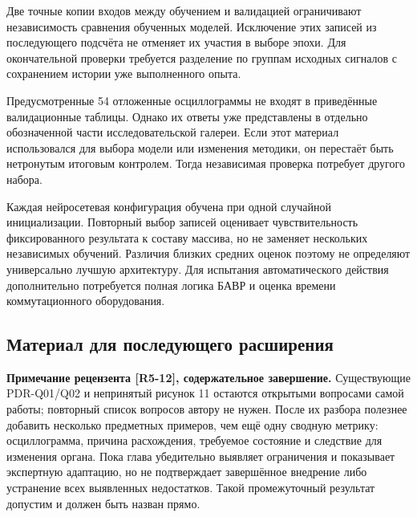 Две точные копии входов между обучением
и валидацией ограничивают независимость
сравнения обученных моделей.
Исключение этих записей из последующего подсчёта
не отменяет их участия в выборе эпохи.
Для окончательной проверки требуется разделение
по группам исходных сигналов
с сохранением истории уже выполненного опыта.

Предусмотренные 54 отложенные осциллограммы
не входят в приведённые валидационные таблицы.
Однако их ответы уже представлены
в отдельно обозначенной части исследовательской галереи.
Если этот материал использовался для выбора модели
или изменения методики, он перестаёт быть
нетронутым итоговым контролем.
Тогда независимая проверка потребует другого набора.

Каждая нейросетевая конфигурация обучена
при одной случайной инициализации.
Повторный выбор записей оценивает
чувствительность фиксированного результата к составу массива,
но не заменяет нескольких независимых обучений.
Различия близких средних оценок
поэтому не определяют универсально лучшую архитектуру.
Для испытания автоматического действия
дополнительно потребуется полная логика БАВР
и оценка времени коммутационного оборудования.

\subsection{Материал для последующего расширения}
\label{sec:ch5_results_pending}

\ifdefined\AuthorReview
\par\smallskip\begingroup\small\raggedright\color{red!60!black}
\noindent\textbf{Примечание рецензента [R5-12], содержательное завершение.} Существующие PDR-Q01/Q02 и непринятый рисунок 11 остаются открытыми вопросами самой работы; повторный список вопросов автору не нужен. После их разбора полезнее добавить несколько предметных примеров, чем ещё одну сводную метрику: осциллограмма, причина расхождения, требуемое состояние и следствие для изменения органа. Пока глава убедительно выявляет ограничения и показывает экспертную адаптацию, но не подтверждает завершённое внедрение либо устранение всех выявленных недостатков. Такой промежуточный результат допустим и должен быть назван прямо.\par\endgroup\smallskip
\fi
\ifdefined\AuthorReview
\par{}\smallskip
\fi


